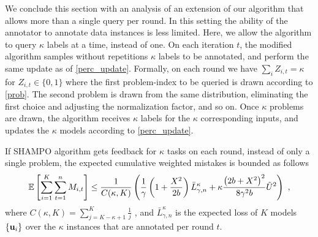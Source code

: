 We conclude this section with an analysis of an extension of our
algorithm that allows more than a single query per round. In this setting the ability  of the annotator to annotate data instances is less limited. Here, we
allow the algorithm to query $\kappa$ labels at a time, instead of one. On each
iteration $t$, the modified algorithm samples without repetitions
$\kappa$ labels to be annotated, and perform the same update as of
\eqref{perc_update}. Formally, on each round we have $\sum_i
Z_{i,t}=\kappa$ for $Z_{i,t}\in\{0,1\}$ where the first problem-index to
be queried is
drawn according to \eqref{prob}. The second problem is drawn from the
same distribution, eliminating the first choice and adjusting the normalization factor, and so on. Once
$\kappa$ problems are drawn, the algorithm receives $\kappa$ labels for
the $\kappa$ corresponding inputs, and updates the $\kappa$ models
according to \eqref{perc_update}.
\begin{corollary}
  If SHAMPO algorithm gets feedback for $\kappa$ tasks on each round,
  instead of only a single problem, the expected cumulative weighted
  mistakes is bounded as follows
\begin{displaymath}
\mathbb{E}\left[ \sum_{i=1}^{K}\sum_{t=1}^{n}{M_{i,t}} \right] 
\le \frac{1}{C(\kappa,K)}\left({\frac{1}{\gamma}\left(1+\frac{X^2}{2b} \right){\bar L}^\kappa_{\gamma,n}
+\kappa\frac{\left({2b+X^2}\right)^2}{8{\gamma}^2b}\tilde{U}^2}\right)~,
\end{displaymath}
where $C(\kappa,K) = \sum_{j=K-\kappa+1}^{K}\frac{1}{j}$ , and
${\bar L}^\kappa_{\gamma,n}$ is the expected loss of $K$ models
$\{\mathbf{u}_{i}\}$ over the $\kappa$ instances that are annotated per round
$t$.
\end{corollary}
